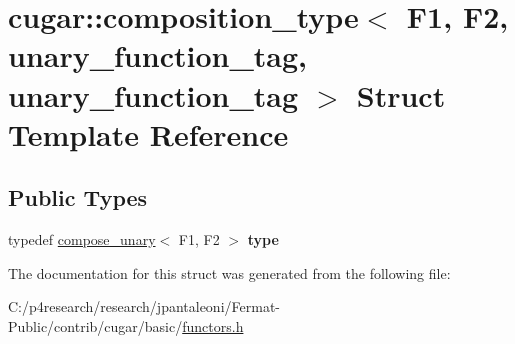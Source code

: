 \hypertarget{structcugar_1_1composition__type_3_01_f1_00_01_f2_00_01unary__function__tag_00_01unary__function__tag_01_4}{}\section{cugar\+:\+:composition\+\_\+type$<$ F1, F2, unary\+\_\+function\+\_\+tag, unary\+\_\+function\+\_\+tag $>$ Struct Template Reference}
\label{structcugar_1_1composition__type_3_01_f1_00_01_f2_00_01unary__function__tag_00_01unary__function__tag_01_4}
\subsection*{Public Types}
\begin{DoxyCompactItemize}
\item 
\mbox{\label{structcugar_1_1composition__type_3_01_f1_00_01_f2_00_01unary__function__tag_00_01unary__function__tag_01_4_a34f9c88d38b72abef395289b337617fd}} 
typedef \hyperlink{structcugar_1_1compose__unary}{compose\+\_\+unary}$<$ F1, F2 $>$ {\bfseries type}
\end{DoxyCompactItemize}


The documentation for this struct was generated from the following file\+:\begin{DoxyCompactItemize}
\item 
C\+:/p4research/research/jpantaleoni/\+Fermat-\/\+Public/contrib/cugar/basic/\hyperlink{functors_8h}{functors.\+h}\end{DoxyCompactItemize}
